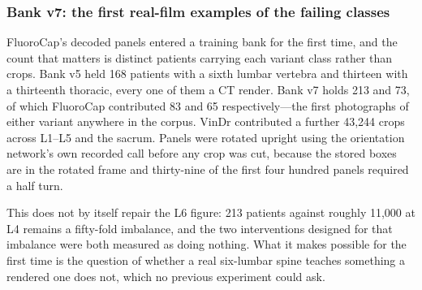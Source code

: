 \documentclass[11pt,letterpaper]{article}
\begin{document}
\subsubsection*{Bank v7: the first real-film examples of the failing classes}
FluoroCap's decoded panels entered a training bank for the first time, and the count that matters is distinct patients carrying each variant class rather than crops. Bank v5 held 168 patients with a sixth lumbar vertebra and thirteen with a thirteenth thoracic, every one of them a CT render. Bank v7 holds 213 and 73, of which FluoroCap contributed 83 and 65 respectively---the first photographs of either variant anywhere in the corpus. VinDr contributed a further 43,244 crops across L1--L5 and the sacrum. Panels were rotated upright using the orientation network's own recorded call before any crop was cut, because the stored boxes are in the rotated frame and thirty-nine of the first four hundred panels required a half turn.

This does not by itself repair the L6 figure: 213 patients against roughly 11,000 at L4 remains a fifty-fold imbalance, and the two interventions designed for that imbalance were both measured as doing nothing. What it makes possible for the first time is the question of whether a real six-lumbar spine teaches something a rendered one does not, which no previous experiment could ask.
\end{document}
